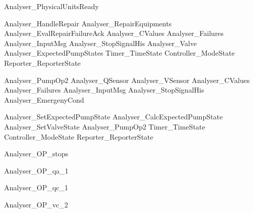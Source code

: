 \documentclass{article}
\begin{document}
\begin{zed}
	Analyser\_PhysicalUnitsReady 
\end{zed}

\begin{zed}
	Analyser\_HandleRepair  Analyser\_RepairEquipments \land Analyser\_EvalRepairFailureAck \land \Xi Analyser\_CValues \land \Xi Analyser\_Failures \land \Xi Analyser\_InputMsg \land \Xi Analyser\_StopSignalHis \land \Xi Analyser\_Valve \land \Xi Analyser\_ExpectedPumpStates \land \Xi Timer\_TimeState \land \Xi Controller\_ModeState \land \Xi Reporter\_ReporterState
\end{zed}

\begin{zed}
	Analyser\_PumpOp2  \Xi Analyser\_QSensor \land \Xi Analyser\_VSensor \land \Xi Analyser\_CValues \land \Xi Analyser\_Failures \land \Xi Analyser\_InputMsg \land \Xi Analyser\_StopSignalHis \land \Xi Analyser\_EmergenyCond
\end{zed}

\begin{zed}
	Analyser\_SetExpectedPumpState  Analyser\_CalcExpectedPumpState \land Analyser\_SetValveState \land Analyser\_PumpOp2 \land \Xi Timer\_TimeState \land \Xi Controller\_ModeState \land \Xi Reporter\_ReporterState
\end{zed}

\begin{zed}
	Analyser\_OP\_stops 
\end{zed}

\begin{zed}
	Analyser\_OP\_qa\_1 
\end{zed}

\begin{zed}
	Analyser\_OP\_qc\_1 
\end{zed}

\begin{zed}
	Analyser\_OP\_vc\_2 
\end{zed}
\end{document}
